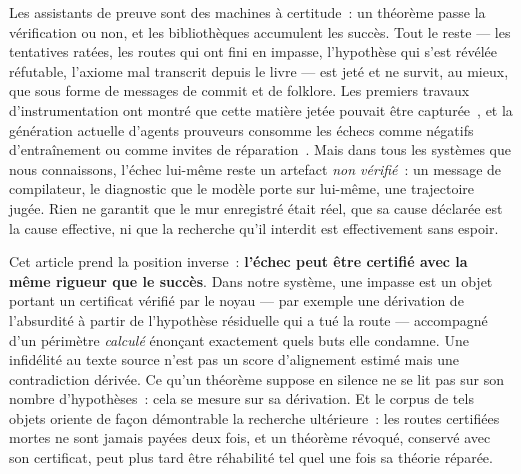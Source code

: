 \documentclass[11pt]{article}
\theoremstyle{remark}\newtheorem{example}{Exemple}
\begin{document}
Les assistants de preuve sont des machines à certitude~: un théorème passe la
vérification ou non, et les bibliothèques accumulent les succès. Tout le reste --- les
tentatives ratées, les routes qui ont fini en impasse, l'hypothèse qui s'est révélée
réfutable, l'axiome mal transcrit depuis le livre --- est jeté et ne survit, au mieux,
que sous forme de messages de commit et de folklore. Les premiers travaux
d'instrumentation ont montré que cette matière jetée pouvait être
capturée~\cite{ringer2020replica}, et la génération actuelle d'agents prouveurs
consomme les échecs comme négatifs d'entraînement ou comme invites de
réparation~\cite{april2026, goedelarchitect2026}. Mais dans tous les systèmes que nous
connaissons, l'échec lui-même reste un artefact \emph{non vérifié}~: un message de
compilateur, le diagnostic que le modèle porte sur lui-même, une trajectoire jugée.
Rien ne garantit que le mur enregistré était réel, que sa cause déclarée est la cause
effective, ni que la recherche qu'il interdit est effectivement sans espoir.

Cet article prend la position inverse~: \textbf{l'échec peut être certifié avec la même
rigueur que le succès}. Dans notre système, une impasse est un objet portant un
certificat vérifié par le noyau --- par exemple une dérivation de l'absurdité à partir
de l'hypothèse résiduelle qui a tué la route --- accompagné d'un périmètre
\emph{calculé} énonçant exactement quels buts elle condamne. Une infidélité au texte
source n'est pas un score d'alignement estimé mais une contradiction dérivée. Ce qu'un
théorème suppose en silence ne se lit pas sur son nombre d'hypothèses~: cela se mesure
sur sa dérivation. Et le corpus de tels objets oriente de façon démontrable la
recherche ultérieure~: les routes certifiées mortes ne sont jamais payées deux fois, et
un théorème révoqué, conservé avec son certificat, peut plus tard être réhabilité tel
quel une fois sa théorie réparée.
\end{document}
